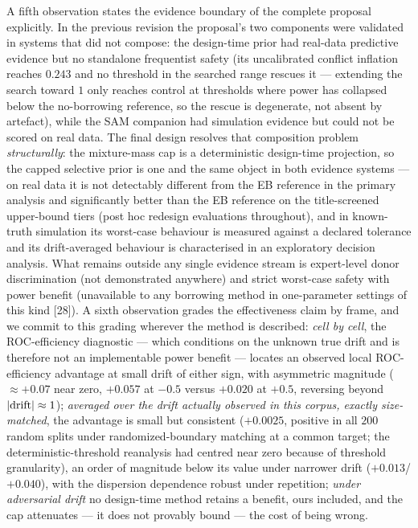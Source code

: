 \documentclass[11pt]{article}
\begin{document}
A fifth observation states the evidence boundary of the complete proposal
explicitly. In the previous revision the proposal's two components were
validated in systems that did not compose: the design-time prior had
real-data predictive evidence but no standalone frequentist safety (its
uncalibrated conflict inflation reaches $0.243$ and no threshold in the
searched range rescues it --- extending the search toward $1$ only reaches
control at thresholds where power has collapsed below the no-borrowing
reference, so the rescue is degenerate, not absent by artefact), while the
SAM companion had simulation evidence but could not be scored on real data.
The final design resolves that composition problem \emph{structurally}: the
mixture-mass cap is a deterministic design-time projection, so the capped
selective prior is one and the same object in both evidence systems --- on
real data it is not detectably different from the EB reference in the
primary analysis and
significantly better
than the EB reference on the title-screened upper-bound tiers (post hoc
redesign evaluations throughout), and in
known-truth simulation its worst-case behaviour is measured against a
declared tolerance and its drift-averaged behaviour is characterised in an
exploratory decision analysis. What
remains outside any single evidence stream is expert-level donor
discrimination (not demonstrated anywhere) and strict worst-case safety
with power benefit (unavailable to any borrowing method in one-parameter
settings of this kind [28]). A sixth
observation grades the effectiveness claim by frame, and we commit to this
grading wherever the method is described: \emph{cell by cell}, the
ROC-efficiency diagnostic --- which conditions on the unknown true drift
and is therefore not an implementable power benefit --- locates an
observed local ROC-efficiency advantage at small drift of either sign,
with asymmetric magnitude ($\approx +0.07$ near zero, $+0.057$ at $-0.5$
versus $+0.020$ at $+0.5$, reversing beyond
$|{\rm drift}| \approx 1$); \emph{averaged over the drift actually
observed in this corpus, exactly size-matched}, the advantage is small
but consistent ($+0.0025$, positive in all $200$ random splits under
randomized-boundary matching at a common target; the
deterministic-threshold reanalysis had centred near zero because of
threshold granularity), an order of magnitude below its value under
narrower drift ($+0.013$/$+0.040$), with the
dispersion dependence robust under repetition; \emph{under adversarial
drift} no design-time method retains a benefit, ours included, and the cap
attenuates --- it does not provably bound --- the cost
of being wrong.
\end{document}
